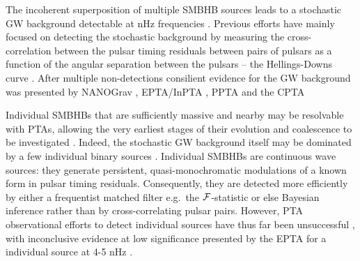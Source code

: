 \documentclass[fleqn,usenatbib,useAMS]{mnras}
\begin{document}
The incoherent superposition of multiple SMBHB sources leads to a stochastic GW background detectable at nHz frequencies \citep{Allen1997,Sesana10,Christensen2019,Renzini2022}. Previous efforts have mainly focused on detecting the stochastic background by measuring the cross-correlation between the pulsar timing residuals between pairs of pulsars as a function of the angular separation between the pulsars -- the Hellings-Downs curve \citep{Hellings}. After multiple non-detections \citep{Lentati2015,NanoGrav2018,2022MNRAS.510.4873A} consilient evidence for the GW background was presented by NANOGrav \citep{2023ApJ...951L...8A}, EPTA/InPTA \citep{2023arXiv230616214A}, PPTA \citep{2023ApJ...951L...6R} and the CPTA \citep{2023RAA....23g5024X} \newline 


Individual SMBHBs that are sufficiently massive and nearby may be resolvable with PTAs, allowing the very earliest stages of their evolution and coalescence to be investigated \citep{Sesana2010,Yardley2010,Zhu10,Babak2012,2013CQGra..30v4004E,Zhupulsarterms}. 
Indeed, the stochastic GW background itself may be dominated by a few individual binary sources \citep{Ravi2012singlesource}. Individual SMBHBs are continuous wave sources: they generate persistent, quasi-monochromatic modulations of a known form in pulsar timing residuals. Consequently, they are detected more efficiently by either a frequentist matched filter e.g.\ the ${\cal F}$-statistic \citep{Lee2011MNRAS.414.3251L, Ellis2012ApJ,Zhu2014PPTA} or else Bayesian inference \citep{Ellis2016,Arzoumanian2020A} rather than by cross-correlating pulsar pairs. However, PTA observational efforts to detect individual sources have thus far been unsuccessful \citep{Jenet2004,Zhu2014PPTA,Babak2016,Arzoumanian2023}, with inconclusive evidence at low significance presented by the EPTA for a individual source at 4-5 nHz \citep{2023arXiv230616226A}. \newline 
\end{document}
